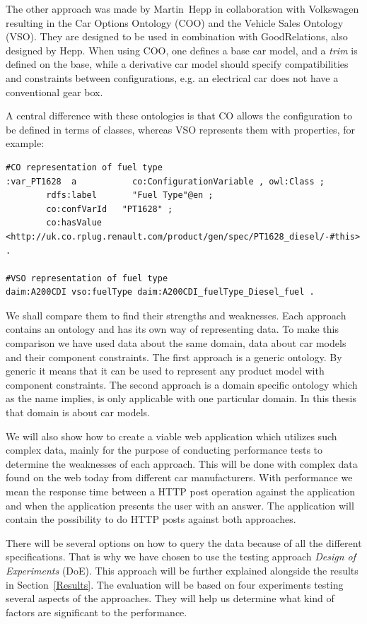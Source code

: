 \documentclass{llncs}
\begin{document}
The other approach was made by Martin~Hepp in collaboration with
Volkswagen resulting in the Car Options Ontology (COO) \cite{COO} and
the Vehicle Sales Ontology (VSO). They are designed to be used in
combination with GoodRelations, also designed by Hepp. When using COO,
one defines a base car model, and a \emph{trim} is defined on the
base, while a derivative car model should specify compatibilities and
constraints between configurations, e.g. an electrical car does not
have a conventional gear box.

A central difference with these ontologies is that CO allows the
configuration to be defined in terms of classes, whereas VSO
represents them with properties, for example:
\begin{lstlisting}[basicstyle=\tiny, frame=single]
#CO representation of fuel type
:var_PT1628  a           co:ConfigurationVariable , owl:Class ;
        rdfs:label       "Fuel Type"@en ;
        co:confVarId   "PT1628" ;
        co:hasValue    <http://uk.co.rplug.renault.com/product/gen/spec/PT1628_diesel/-#this> .

#VSO representation of fuel type
daim:A200CDI vso:fuelType daim:A200CDI_fuelType_Diesel_fuel .
\end{lstlisting}



We shall compare them to find their strengths and
weaknesses. Each approach contains an ontology and has its own way of
representing data.  To make this comparison we have used data about
the same domain, data about car models and their component
constraints.  The first approach is a generic ontology. By generic it
means that it can be used to represent any product model with
component constraints. The second approach is a domain specific
ontology which as the name implies, is only applicable with one
particular domain. In this thesis that domain is about car models.

We will also show how to create a viable web application which
utilizes such complex data, mainly for the purpose of conducting
performance tests to determine the weaknesses of each approach. This
will be done with complex data found on the web today from different
car manufacturers.  With performance we mean the response time between
a HTTP post operation against the application and when
the application presents the user with an answer. The application will
contain the possibility to do HTTP posts against both approaches.

There will be several options on how to query the data because of all
the different specifications.  That is why we have chosen to use the
testing approach \emph{Design of Experiments} (DoE). This approach
will be further explained alongside the results in
Section~\ref{Results}. The evaluation will be based on four
experiments testing several aspects of the approaches. They will help
us determine what kind of factors are significant to the performance.
\end{document}
